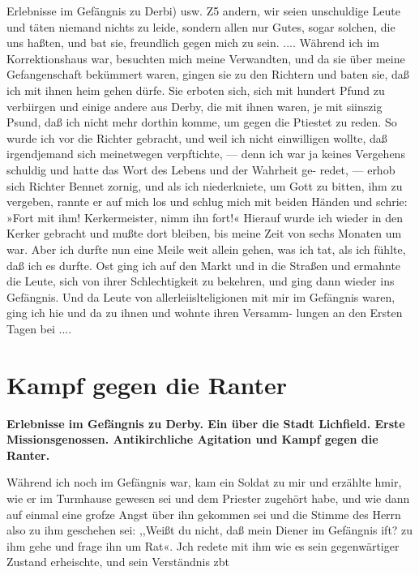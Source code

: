 Erlebnisse im Gefängnis zu Derbi) usw. Z5
andern, wir seien unschuldige Leute und täten niemand nichts zu
leide, sondern allen nur Gutes, sogar solchen, die uns haßten,
und bat sie, freundlich gegen mich zu sein. ....
Während ich im Korrektionshaus war, besuchten mich meine
Verwandten, und da sie über meine Gefangenschaft bekümmert
waren, gingen sie zu den Richtern und baten sie, daß ich mit
ihnen heim gehen dürfe. Sie erboten sich, sich mit hundert Pfund
zu verbiirgen und einige andere aus Derby, die mit ihnen waren,
je mit siinszig Psund, daß ich nicht mehr dorthin komme, um
gegen die Ptiestet zu reden. So wurde ich vor die Richter
gebracht, und weil ich nicht einwilligen wollte, daß irgendjemand
sich meinetwegen verpftichte, — denn ich war ja keines Vergehens
schuldig und hatte das Wort des Lebens und der Wahrheit ge-
redet, — erhob sich Richter Bennet zornig, und als ich niederkniete, um
Gott zu bitten, ihm zu vergeben, rannte er auf mich los und schlug
mich mit beiden Händen und schrie: »Fort mit ihm! Kerkermeister,
nimm ihn fort!« Hierauf wurde ich wieder in den Kerker gebracht
und mußte dort bleiben, bis meine Zeit von sechs Monaten um
war. Aber ich durfte nun eine Meile weit allein gehen, was ich
tat, als ich fühlte, daß ich es durfte. Ost ging ich auf den Markt
und in die Straßen und ermahnte die Leute, sich von ihrer
Schlechtigkeit zu bekehren, und ging dann wieder ins Gefängnis.
Und da Leute von allerleiislteligionen mit mir im Gefängnis
waren, ging ich hie und da zu ihnen und wohnte ihren Versamm-
lungen an den Ersten Tagen bei ....


\chapter[Kampf gegen die Ranter]{Kampf gegen die Ranter}

\begin{center}
\textbf{Erlebnisse im Gefängnis zu Derby. Ein  
über die Stadt
Lichfield. Erste Missionsgenossen. Antikirchliche 
Agitation und Kampf gegen die Ranter.}
\end{center}


Während ich noch im Gefängnis war, kam ein Soldat zu
mir und erzählte hmir, wie er im Turmhause gewesen sei und dem
Priester zugehört habe, und wie dann auf einmal eine grofze Angst
über ihn gekommen sei und die Stimme des Herrn also zu ihm
geschehen sei: ,,Weißt du nicht, daß mein Diener im Gefängnis
ift? zu ihm gehe und frage ihn um Rat«. Jch redete mit ihm
wie es sein gegenwärtiger Zustand erheischte, und sein Verständnis
zbt


